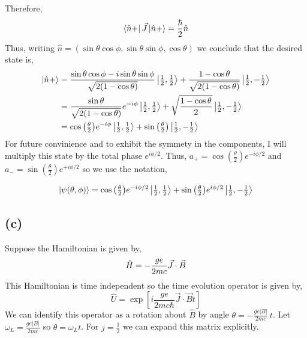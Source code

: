 \documentclass[12pt]{extarticle}
\begin{document}
Therefore, 
\[\left< \hat{n} + \right| \vec{J} \left| \hat{n} +  \right> = \frac{\hbar}{2} \hat{n}\]
Thus, writing $\hat{n} = (\sin{\theta}\cos{\phi}, \sin{\theta} \sin{\phi}, \cos{\theta})$ we conclude that the desired state is,
\begin{align*}
\left| \hat{n} + \right> & = 
\frac{\sin{\theta}\cos{\phi} - i  \sin{\theta} \sin{\phi}}{\sqrt{2(1-  \cos{\theta})}} \left| \tfrac{1}{2}, \tfrac{1}{2} \right> + \frac{1 -  \cos{\theta}}{\sqrt{2(1-  \cos{\theta})}} \left| \tfrac{1}{2}, - \tfrac{1}{2} \right> 
\\ & =
\frac{\sin{\theta}}{\sqrt{2(1-  \cos{\theta})}} e^{- i \phi} \left| \tfrac{1}{2}, \tfrac{1}{2} \right> + \sqrt{\frac{1 -  \cos{\theta}}{2}} \left| \tfrac{1}{2}, - \tfrac{1}{2} \right> 
\\ & = 
\cos{\left(\tfrac{\theta}{2} \right)} e^{- i \phi} \left| \tfrac{1}{2}, \tfrac{1}{2} \right> + \sin{\left(\tfrac{\theta}{2} \right)} \left| \tfrac{1}{2}, - \tfrac{1}{2} \right> 
\end{align*}
For future convinience and to exhibit the symmety in the components, I will multiply this state by the total phase $e^{i \phi/2}$. Thus, $a_{+} = \cos{\left(\tfrac{\theta}{2} \right)} e^{- i \phi/2}$ and $a_{-} = \sin{\left(\tfrac{\theta}{2} \right)} e^{+ i \phi/2}$ so we use the notation, 

\[\left| \psi(\theta, \phi) \right> =  \cos{\left(\tfrac{\theta}{2} \right)} e^{- i \phi/2} \left| \tfrac{1}{2}, \tfrac{1}{2} \right> + \sin{\left(\tfrac{\theta}{2} \right)} e^{i \phi/2} \left| \tfrac{1}{2}, - \tfrac{1}{2} \right> \]

\subsection*{(c)} 

Suppose the Hamiltonian is given by, 
\[\hat{H} = - \frac{g e}{2 m c} \vec{J} \cdot \vec{B}\]
This Hamiltonian is time independent so the time evolution operator is given by,
\[ \hat{U} = \exp{\left[i \frac{g e}{2 m c \hbar} \vec{J} \cdot \vec{B} t \right]} \]
We can identify this operator as a rotation about $\hat{B}$ by angle $\theta = - \frac{g e |B|}{2mc} \: t$. Let $\omega_L = \frac{g e |B|}{2mc}$ so $\theta = \omega_L t$. For $j = \frac{1}{2}$ we can expand this matrix explicitly.
\end{document}
